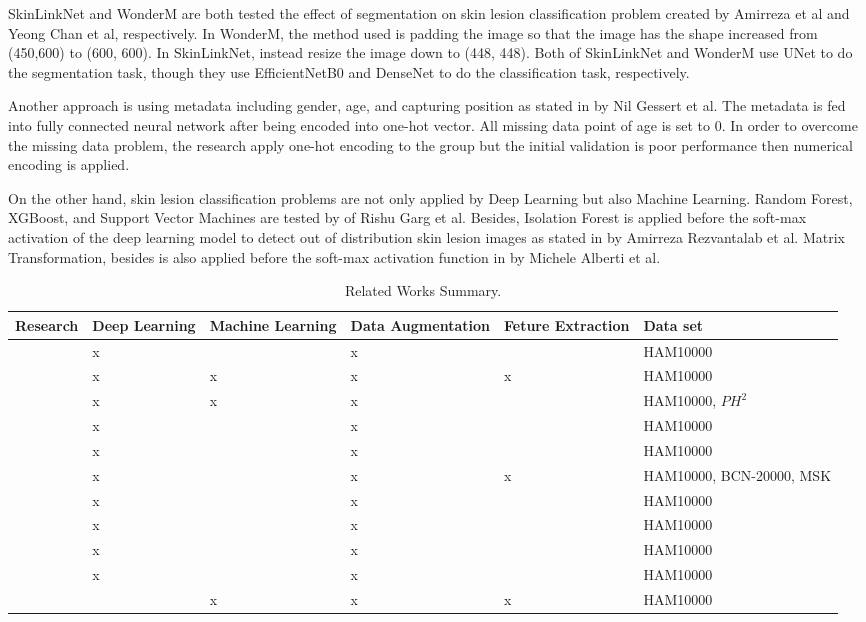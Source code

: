\documentclass[sensors,article,submit,pdftex,moreauthors]{Definitions/mdpi}
\begin{document}
SkinLinkNet \cite{12602} and WonderM \cite{03426} are both tested the effect of segmentation on skin lesion classification problem created by Amirreza et al and Yeong Chan et al, respectively. In WonderM, the method used is padding the image so that the image has the shape increased from (450,600) to (600, 600). In SkinLinkNet, instead resize the image down to (448, 448). Both of SkinLinkNet and WonderM use UNet to do the segmentation task, though they use EfficientNetB0 and DenseNet to do the classification task, respectively. 

Another approach is using metadata including gender, age, and capturing position as stated in  \cite{03910} by Nil Gessert et al. The metadata is fed into fully connected neural network after being encoded into one-hot vector. All missing data point of age is set to 0. In order to overcome the missing data problem, the research apply one-hot encoding to the group but the initial validation is poor performance then numerical encoding is applied.

On the other hand, skin lesion classification problems are not only applied by Deep Learning but also Machine Learning. Random Forest, XGBoost, and Support Vector Machines are tested by  \cite{03798} of Rishu Garg et al. Besides, Isolation Forest is applied before the soft-max activation of the deep learning model to detect out of distribution skin lesion images as stated in \cite{10348} by Amirreza Rezvantalab et al. Matrix Transformation, besides is also applied before the soft-max activation function in \cite{05045} by Michele Alberti et al. 

\begin{table}
	\centering
	\begin{tabular}{| c | p{1.5cm} | p{1.5cm} | p{2cm} | p{1.5cm} | p{2cm} |}
		\hline
		Research & Deep Learning & Machine Learning & Data 
		Augmentation & Feture Extraction & Data set\\
		\hline
		\cite{03358} & x & & x & & HAM10000\\
		\hline
		\cite{03798} & x & x & x & x & HAM10000\\
		\hline
		\cite{10348} & x & x & x & & HAM10000, $PH^2$\\
		\hline
		\cite{09418} & x & & x & & HAM10000\\
		\hline
		\cite{01284} & x & & x & & HAM10000\\
		\hline
		\cite{06612} & x & & x & x & HAM10000, BCN-20000, MSK\\
		\hline
		\cite{03225} & x & & x & & HAM10000\\
		\hline
		\cite{12602} & x & & x & & HAM10000\\
		\hline
		\cite{03426} & x & & x & & HAM10000\\
		\hline
		\cite{03910} & x & & x & & HAM10000\\
		\hline
		\cite{05045} & & x & x & x & HAM10000\\
		\hline
	\end{tabular}
	\caption{Related Works Summary.}
	\label{table:related-work-summary}
\end{table}
\end{document}
